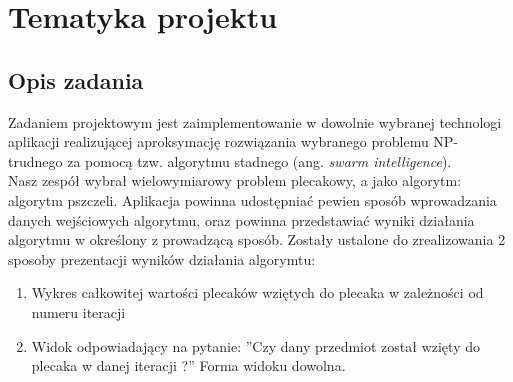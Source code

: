\documentclass[a4paper,12pt,notitlepage]{mwrep}
\begin{document}
\onehalfspacing


\rfoot{\scriptsize{\wersja}}
\setcounter{secnumdepth}{2}

\setcounter{tocdepth}{2}


\vfill
\begin{center}
\singlespacing
{}
\onehalfspacing
\end{center}

\tableofcontents

\chapter{Tematyka projektu}
\section{Opis zadania}
Zadaniem projektowym jest zaimplementowanie w dowolnie wybranej technologi aplikacji
realizującej aproksymację rozwiązania wybranego problemu NP-trudnego
za pomocą tzw. algorytmu stadnego (ang. \emph{swarm intelligence}).\\
Nasz zespół wybrał wielowymiarowy problem plecakowy, a jako algorytm:
algorytm pszczeli.
Aplikacja powinna udostępniać pewien sposób wprowadzania danych wejściowych algorytmu,
oraz powinna przedstawiać wyniki działania algorytmu w określony z prowadzącą sposób.\de
Zostały ustalone do zrealizowania 2 sposoby prezentacji wyników działania algorymtu:
\begin{enumerate}
	\item	Wykres całkowitej wartości plecaków wziętych do plecaka
			w zależności od numeru iteracji
	\item	Widok odpowiadający na pytanie: ''Czy dany przedmiot został wzięty
			do plecaka w danej iteracji ?''
			Forma widoku dowolna.
\end{enumerate}
\end{document}
